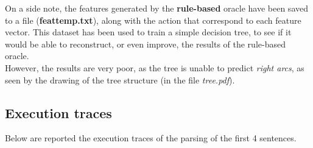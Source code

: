 \documentclass[
12pt,
a4paper,
oneside,
headinclude,
footinclude]{article}
\begin{document}
    On a side note, the features generated by the \textbf{rule-based} oracle have been saved to a file (\textbf{feattemp.txt}), along with the action that correspond to each feature vector. This dataset has been used to train a simple decision tree, to see if it would be able to reconstruct, or even improve, the results of the rule-based oracle.\\
    However, the results are very poor, as the tree is unable to predict \textit{right arcs}, as seen by the drawing of the tree structure (in the file \textit{tree.pdf}).
    
    \subsection{Execution traces}
    Below are reported the execution traces of the parsing of the first 4 sentences.
\end{document}
